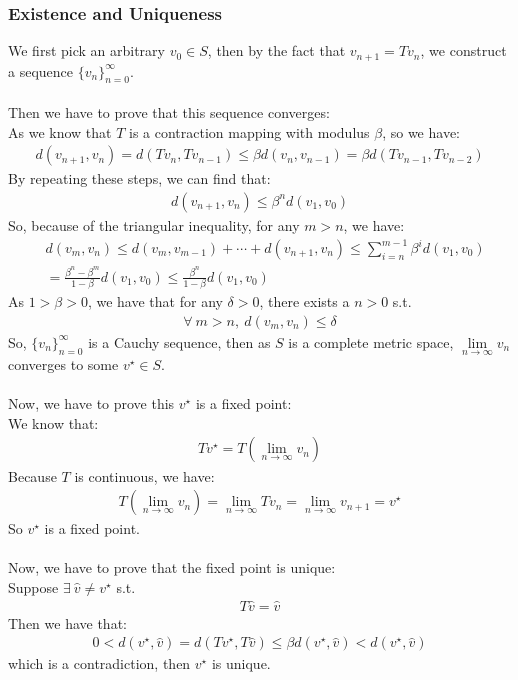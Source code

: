 \documentclass{article}
\begin{document}
\subsubsection{Existence and Uniqueness} 
We first pick an arbitrary $v_0 \in S$, then by the fact that $v_{n+1} = Tv_n$, we construct a sequence $\{v_n\}^\infty_{n=0}$.\\\\
Then we have to prove that this sequence converges:\\
As we know that $T$ is a contraction mapping with modulus $\beta$, so we have:
\begin{align*}
	d(v_{n+1}, v_{n}) = d(Tv_{n}, Tv_{n-1}) \leq \beta d(v_{n}, v_{n-1}) = \beta d(Tv_{n-1}, Tv_{n-2})
\end{align*}
By repeating these steps, we can find that:
\begin{align*}
	d(v_{n+1}, v_{n}) \leq \beta^n d(v_1, v_0)
\end{align*}
So, because of the triangular inequality, for any $m > n$, we have:
\begin{align*}
	&d(v_m, v_n) \leq d(v_m, v_{m-1}) + \cdots + d(v_{n+1}, v_n) \leq \sum\limits^{m-1}_{i=n}\beta^i d(v_1, v_0)\\
	&= \frac{\beta^n - \beta^m}{1 - \beta} d(v_1, v_0) \leq \frac{\beta^n}{1 - \beta} d(v_1, v_0)
\end{align*}
As $1 > \beta >0$, we have that for any $\delta > 0$, there exists a $n > 0$ s.t.
\begin{align*}
	\forall\ m > n,\ d(v_m, v_n) \leq \delta
\end{align*}
So, $\{v_n\}^\infty_{n=0}$ is a Cauchy sequence, then as $S$ is a complete metric space, $\lim\limits_{n \to \infty}v_n$ converges to some $v^\star \in S$.\\\\
Now, we have to prove this $v^\star$ is a fixed point:\\
We know that:
\begin{align*}
	Tv^\star = T(\lim\limits_{n \to \infty}v_n)
\end{align*}
Because $T$ is continuous, we have:
\begin{align*}
	T(\lim\limits_{n \to \infty}v_n) = \lim\limits_{n \to \infty}Tv_n = \lim\limits_{n \to \infty}v_{n+1} = v^\star
\end{align*}
So $v^\star$ is a fixed point.\\\\
Now, we have to prove that the fixed point is unique:\\
Suppose $\exists\ \hat{v} \neq v^\star$ s.t.
\begin{align*}
	T\hat{v} = \hat{v}
\end{align*}
Then we have that:
\begin{align*}
	0 < d(v^\star, \hat{v}) = d(Tv^\star, T\hat{v}) \leq \beta d(v^\star, \hat{v}) < d(v^\star, \hat{v})
\end{align*}
which is a contradiction, then $v^\star$ is unique.
\end{document}
